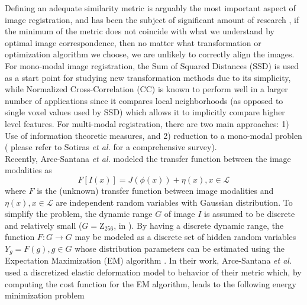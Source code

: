 Defining an adequate similarity metric is arguably the most important aspect of image registration, and has been the subject of significant amount of research \cite{Sotiras2013}, if
the minimum of the metric does not coincide with what we understand by optimal image correspondence, then no matter what transformation or optimization algorithm we choose, we are
unlikely to correctly align the images. For mono-modal image registration, the Sum of Squared Distances (SSD) is used as a start point for studying new transformation methods due to
its simplicity, while Normalized Cross-Correlation (CC) is known to perform well in a larger number of applications since it compares local neighborhoods (as opposed to single
voxel values used by SSD) which allows it to implicitly compare higher level features. For multi-modal registration, there are two main approaches: 1) Use of information theoretic
measures, and 2) reduction to a mono-modal problen ( please refer to Sotiras {\it et al.} \cite{Sotiras2013} for a comprehensive survey).\\

Recently, Arce-Santana {\it et al.} \cite{Arce-santana2014} modeled the transfer function between the image modalities as
\begin{equation}\label{eq:arce_model}
    F[I(x)] = J(\phi(x)) + \eta(x), x\in \mathcal{L}
\end{equation}
where $F$ is the (unknown) transfer function between image modalities and $\eta(x), x\in \mathcal{L}$ are independent random variables with Gaussian distribution. To simplify
the problem, the dynamic range $G$ of image $I$ is assumed to be discrete and relatively small ($G = \mathrm{Z}_{256}$, in \cite{Arce-santana2014}). By having a discrete
dynamic range, the function $F: G \rightarrow G$ may be modeled as a discrete set of hidden random variables $Y_g = F(g), g\in G$ whose distribution parameters
can be estimated using the Expectation Maximization (EM) algorithm \cite{Dempster1977}. In their work, Arce-Santana {\it et al.} \cite{Arce-santana2014} used a discretized elastic
deformation model to behavior of their metric which, by computing the cost function for the EM algorithm, leads to the following energy minimization problem

